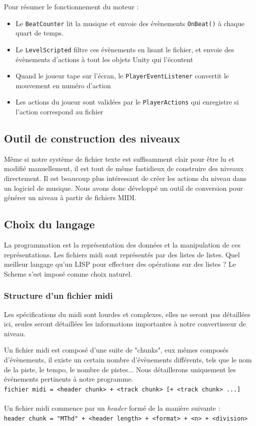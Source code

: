 Pour résumer le fonctionnement du moteur :
\begin{itemize}
\item Le \texttt{BeatCounter} lit la musique et envoie des évènements \texttt{OnBeat()} à chaque quart de temps.
\item Le \texttt{LevelScripted} filtre ces évènements en lisant le fichier, et envoie des évènements d'actions à tout les objets Unity qui l'écoutent
\item Quand le joueur tape sur l'écran, le \texttt{PlayerEventListener} convertit le mouvement en numéro d'action
\item Les actions du joueur sont validées par le \texttt{PlayerActions} qui enregistre si l'action correspond au fichier
\end{itemize}

\subsection{Outil de construction des niveaux}

Même si notre système de fichier texte est suffisamment clair pour être lu et modifié manuellement, il est tout de même fastidieux de construire des niveaux directement. Il est beaucoup plus intéressant de créer les actions du niveau dans un logiciel de musique. Nous avons donc développé un outil de conversion pour générer un niveau à partir de fichiers MIDI.

\subsection{Choix du langage}
La programmation est la représentation des données et la manipulation de ces représentations. Les fichiers midi sont représentés par des listes de listes. Quel meilleur langage qu'un LISP pour effectuer des opérations sur des listes ? Le Scheme s'est imposé comme choix naturel.

\subsubsection{Structure d'un fichier midi}
Les spécifications du midi sont lourdes et complexes, elles ne seront pas détaillées ici, seules seront détaillées les informations importantes à notre convertisseur de niveau.

Un fichier midi est composé d'une suite de "chunks", eux mêmes composés d'évènements, il existe un certain nombre d'évènements différents, tels que le nom de la piste, le tempo, le nombre de pistes... Nous détaillerons uniquement les événements pertinents à notre programme.\\
{\small \texttt{fichier midi = <header chunk> + <track chunk> [+ <track chunk> ...]}}\\\\
Un fichier midi commence par un \textit{header} formé de la manière suivante :\\
{\small \texttt{header chunk = "MThd" + <header length> + <format> + <n> + <division>}}\\

